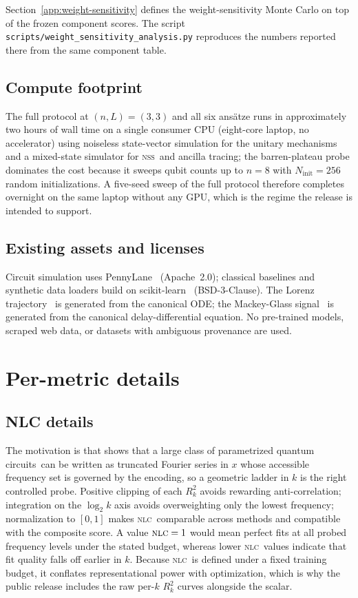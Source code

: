 \documentclass{article}
\newcommand{\nlc}{\textsc{nlc}}
\newcommand{\nss}{\textsc{nss}}
\newcommand{\pqcs}{parametrized quantum circuits}
\begin{document}
Section~\ref{app:weight-sensitivity} defines the weight-sensitivity Monte Carlo on top of the frozen component scores.
The script \texttt{scripts/weight\_sensitivity\_analysis.py} reproduces the numbers reported there from the same component table.

\subsection{Compute footprint}

The full protocol at $(n, L) = (3, 3)$ and all six ans\"atze runs in approximately two hours of wall time on a single consumer CPU (eight-core laptop, no accelerator) using noiseless state-vector simulation for the unitary mechanisms and a mixed-state simulator for \nss\ and ancilla tracing; the barren-plateau probe dominates the cost because it sweeps qubit counts up to $n=8$ with $N_{\mathrm{init}} = 256$ random initializations.
A five-seed sweep of the full protocol therefore completes overnight on the same laptop without any GPU, which is the regime the release is intended to support.

\subsection{Existing assets and licenses}

Circuit simulation uses PennyLane~\citep{bergholm2018pennylane} (Apache~2.0); classical baselines and synthetic data loaders build on scikit-learn~\citep{pedregosa2011scikitlearn} (BSD-3-Clause).
The Lorenz trajectory~\citep{lorenz1963} is generated from the canonical ODE; the Mackey-Glass signal~\citep{mackeyglass1977} is generated from the canonical delay-differential equation.
No pre-trained models, scraped web data, or datasets with ambiguous provenance are used.

\section{Per-metric details}
\label{app:metric-details}

\subsection{NLC details}

The motivation is that \citet{schuld2021effect} shows that a large class of \pqcs\ can be written as truncated Fourier series in $x$ whose accessible frequency set is governed by the encoding, so a geometric ladder in $k$ is the right controlled probe.
Positive clipping of each $R^2_k$ avoids rewarding anti-correlation; integration on the $\log_2 k$ axis avoids overweighting only the lowest frequency; normalization to $[0,1]$ makes \nlc\ comparable across methods and compatible with the composite score.
A value $\nlc = 1$ would mean perfect fits at all probed frequency levels under the stated budget, whereas lower \nlc\ values indicate that fit quality falls off earlier in $k$.
Because \nlc\ is defined under a fixed training budget, it conflates representational power with optimization, which is why the public release includes the raw per-$k$ $R^2_k$ curves alongside the scalar.
\end{document}

